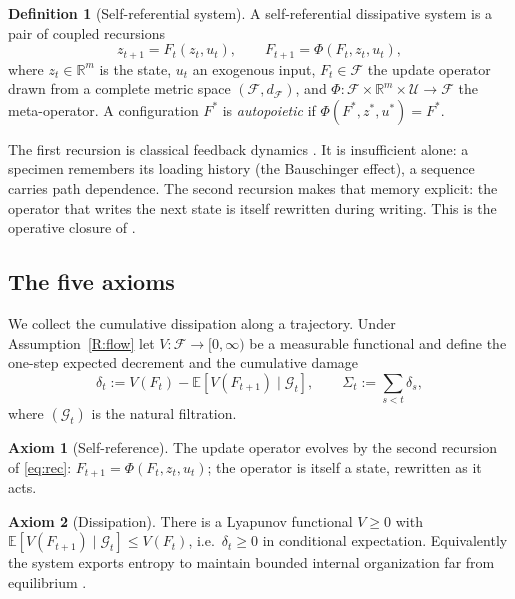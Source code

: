 \documentclass[11pt]{article}
\theoremstyle{plain}
\theoremstyle{definition}
\newtheorem{definition}[theorem]{Definition}
\newtheorem{axiom}{Axiom}
\theoremstyle{remark}
\newcommand{\R}{\mathbb{R}}
\newcommand{\E}{\mathbb{E}}
\begin{document}
\begin{definition}[Self-referential system]\label{def:srds}
A self-referential dissipative system is a pair of coupled recursions
\begin{equation}\label{eq:rec}
z_{t+1}=F_t(z_t,u_t),\qquad F_{t+1}=\Phi(F_t,z_t,u_t),
\end{equation}
where $z_t\in\R^m$ is the state, $u_t$ an exogenous input, $F_t\in\mathcal F$ the update operator drawn from a complete metric space $(\mathcal F,d_{\mathcal F})$, and $\Phi:\mathcal F\times\R^m\times\mathcal U\to\mathcal F$ the meta-operator. A configuration $F^*$ is \emph{autopoietic} if $\Phi(F^*,z^*,u^*)=F^*$.
\end{definition}

The first recursion is classical feedback dynamics \citep{wiener1948,ashby1956}. It is insufficient alone: a specimen remembers its loading history (the Bauschinger effect), a sequence carries path dependence. The second recursion makes that memory explicit: the operator that writes the next state is itself rewritten during writing. This is the operative closure of \citep{maturana1980}.

\subsection{The five axioms}

We collect the cumulative dissipation along a trajectory. Under Assumption~\ref{R:flow} let $V:\mathcal F\to[0,\infty)$ be a measurable functional and define the one-step expected decrement and the cumulative damage
\begin{equation}\label{eq:damage}
\delta_t:=V(F_t)-\E\!\left[V(F_{t+1})\mid \mathcal G_t\right],\qquad
\Sigma_t:=\sum_{s<t}\delta_s,
\end{equation}
where $(\mathcal G_t)$ is the natural filtration.

\begin{axiom}[Self-reference]\label{ax:self}
The update operator evolves by the second recursion of \eqref{eq:rec}: $F_{t+1}=\Phi(F_t,z_t,u_t)$; the operator is itself a state, rewritten as it acts.
\end{axiom}

\begin{axiom}[Dissipation]\label{ax:diss}
There is a Lyapunov functional $V\ge0$ with $\E[V(F_{t+1})\mid\mathcal G_t]\le V(F_t)$, i.e.\ $\delta_t\ge0$ in conditional expectation. Equivalently the system exports entropy to maintain bounded internal organization far from equilibrium \citep{prigogine1977}.
\end{axiom}
\end{document}
